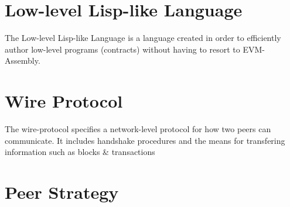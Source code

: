 \documentclass[9pt,oneside]{amsart}
\begin{document}

\section{Low-level Lisp-like Language}\label{app:lll}

The Low-level Lisp-like Language is a language created in order to efficiently author low-level programs (contracts) without having to resort to EVM-Assembly.

\section{Wire Protocol}\label{app:wire}

The wire-protocol specifies a network-level protocol for how two peers can communicate. It includes handshake procedures and the means for transfering information such as blocks \& transactions

\section{Peer Strategy}\label{app:peers}
\end{document}
